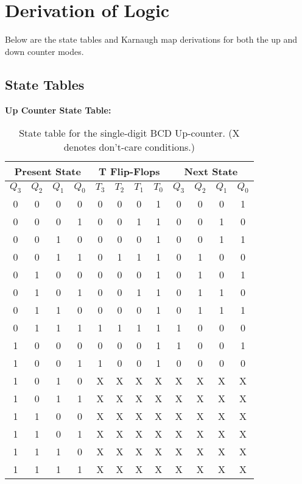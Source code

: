 \documentclass[12pt]{article}
\begin{document}
\section*{Derivation of Logic}

Below are the state tables and Karnaugh map derivations for both the up and down counter modes.

\subsection*{State Tables}

\textbf{Up Counter State Table:}
\begin{table}[H]
\centering
\begin{tabular}{|c|c|c|c||c|c|c|c||c|c|c|c|}
\hline
\multicolumn{4}{|c||}{Present State} & \multicolumn{4}{c||}{T Flip-Flops} & \multicolumn{4}{c|}{Next State} \\
\hline
\(Q_3\) & \(Q_2\) & \(Q_1\) & \(Q_0\) & \(T_3\) & \(T_2\) & \(T_1\) & \(T_0\) & \(Q_3\) & \(Q_2\) & \(Q_1\) & \(Q_0\) \\
\hline
0 & 0 & 0 & 0 & 0 & 0 & 0 & 1 & 0 & 0 & 0 & 1 \\
\hline
0 & 0 & 0 & 1 & 0 & 0 & 1 & 1 & 0 & 0 & 1 & 0 \\
\hline
0 & 0 & 1 & 0 & 0 & 0 & 0 & 1 & 0 & 0 & 1 & 1 \\
\hline
0 & 0 & 1 & 1 & 0 & 1 & 1 & 1 & 0 & 1 & 0 & 0 \\
\hline
0 & 1 & 0 & 0 & 0 & 0 & 0 & 1 & 0 & 1 & 0 & 1 \\
\hline
0 & 1 & 0 & 1 & 0 & 0 & 1 & 1 & 0 & 1 & 1 & 0 \\
\hline
0 & 1 & 1 & 0 & 0 & 0 & 0 & 1 & 0 & 1 & 1 & 1 \\
\hline
0 & 1 & 1 & 1 & 1 & 1 & 1 & 1 & 1 & 0 & 0 & 0 \\
\hline
1 & 0 & 0 & 0 & 0 & 0 & 0 & 1 & 1 & 0 & 0 & 1 \\
\hline
1 & 0 & 0 & 1 & 1 & 0 & 0 & 1 & 0 & 0 & 0 & 0 \\
\hline
1 & 0 & 1 & 0 & X & X & X & X & X & X & X & X \\
\hline
1 & 0 & 1 & 1 & X & X & X & X & X & X & X & X \\
\hline
1 & 1 & 0 & 0 & X & X & X & X & X & X & X & X \\
\hline
1 & 1 & 0 & 1 & X & X & X & X & X & X & X & X \\
\hline
1 & 1 & 1 & 0 & X & X & X & X & X & X & X & X \\
\hline
1 & 1 & 1 & 1 & X & X & X & X & X & X & X & X \\
\hline
\end{tabular}
\caption{State table for the single-digit BCD Up-counter. (X denotes don't-care conditions.)}
\end{table}
\end{document}
